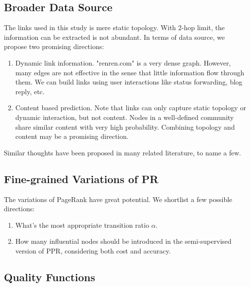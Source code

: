 \documentclass[11pt,a4paper]{article}
\begin{document}
\subsection{Broader Data Source}

The links used in this study is mere static topology. 
With 2-hop limit, the information can be extracted 
is not abundant. In terms of data source, we propose 
two promising directions:
\begin{enumerate}
	\item Dynamic link information. "renren.com" is a very 
	dense graph. However, many edges are not effective in the sense
	that little information flow through them. We can 
	build links using user interactions like status forwarding, 
	blog reply, etc. 
	\item Content based prediction. Note that links can only capture
	static topology or dynamic interaction, but not content. Nodes in a 
	well-defined community share similar content with very high 
	probability. Combining topology and content may be a promising 
	direction. 
\end{enumerate}

Similar thoughts have been proposed in many related literature, to name 
a few\cite{boccaletti2006complex,aggarwal2011social}. 

\subsection{Fine-grained Variations of PR}

The variations of PageRank have great potential. We
shortlist a few possible directions:
\begin{enumerate}
	\item What's the most appropriate transition ratio $\alpha$. 
	\item How many influential nodes should be introduced 
	in the semi-supervised version of PPR, considering
	both cost and accuracy. 
\end{enumerate}

\subsection{Quality Functions}
\end{document}
